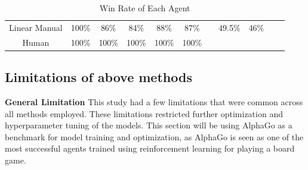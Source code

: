 \documentclass[a4paper,12pt,table]{article}
\begin{document}
\begin{table}[H]
{\begin{tabular}{|c|cccccccccc}
    Linear Manual & \multicolumn{1}{c|}{100\%}                       & \multicolumn{1}{c|}{86\%}                        & \multicolumn{1}{c|}{84\%}                       & \multicolumn{1}{c|}{88\%}                       & \multicolumn{1}{c|}{87\%}                       & \multicolumn{1}{c|}{}                           & \multicolumn{1}{c|}{49.5\%}                     & \multicolumn{1}{c|}{46\%}                        & \cellcolor[HTML]{000000}                        & \cellcolor[HTML]{000000}                        \\ \cline{1-10}
    Human          & \multicolumn{1}{c|}{100\%}                      & \multicolumn{1}{c|}{100\%}                      & \multicolumn{1}{c|}{100\%}                      & \multicolumn{1}{c|}{100\%}                      & \multicolumn{1}{c|}{100\%}                      & \multicolumn{1}{c|}{}                           & \multicolumn{1}{c|}{}                           & \multicolumn{1}{c|}{}                           & \multicolumn{1}{c|}{}                           & \cellcolor[HTML]{000000}                        \\ \cline{1-10}
    \end{tabular}%
    }
    \caption{Win Rate of Each Agent}
    \label{table:}
\end{table}


\subsection{Limitations of above methods}

\textbf{General Limitation}
\newline
This study had a few limitations that were common across all methods employed. These limitations restricted further optimization and hyperparameter tuning of the models. This section will be using AlphaGo as a benchmark for model training and optimization, as AlphaGo is seen as one of the most successful agents trained using reinforcement learning for playing a board game. \par
\end{document}
